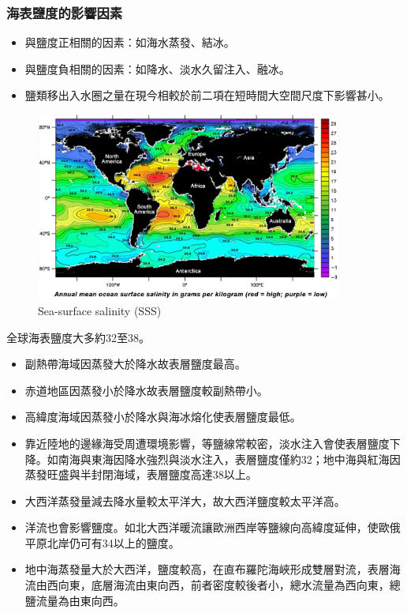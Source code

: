 \documentclass[a4paper,12pt]{report}
\begin{document}
\subsubsection{海表鹽度的影響因素}
\begin{itemize}
\item 與鹽度正相關的因素：如海水蒸發、結冰。
\item 與鹽度負相關的因素：如降水、淡水久留注入、融冰。
\item 鹽類移出入水圈之量在現今相較於前二項在短時間大空間尺度下影響甚小。
\end{itemize}
\begin{figure}[H]
    \centering
    \includegraphics[width=0.9\textwidth]{SSS.jpg}
    \caption{Sea-surface salinity (SSS)}
\end{figure}\FB
全球海表鹽度大多約32\textperthousand  至38\textperthousand 。
\begin{itemize}
\item 副熱帶海域因蒸發大於降水故表層鹽度最高。
\item 赤道地區因蒸發小於降水故表層鹽度較副熱帶小。
\item 高緯度海域因蒸發小於降水與海冰熔化使表層鹽度最低。
\item 靠近陸地的邊緣海受周遭環境影響，等鹽線常較密，淡水注入會使表層鹽度下降。如南海與東海因降水強烈與淡水注入，表層鹽度僅約32\textperthousand ；地中海與紅海因蒸發旺盛與半封閉海域，表層鹽度高達38\textperthousand 以上。
\item 大西洋蒸發量減去降水量較太平洋大，故大西洋鹽度較太平洋高。
\item 洋流也會影響鹽度。如北大西洋暖流讓歐洲西岸等鹽線向高緯度延伸，使歐俄平原北岸仍可有34\textperthousand 以上的鹽度。
\item 地中海蒸發量大於大西洋，鹽度較高，在直布羅陀海峽形成雙層對流，表層海流由西向東，底層海流由東向西，前者密度較後者小，總水流量為西向東，總鹽流量為由東向西。
\end{itemize}
\end{document}
